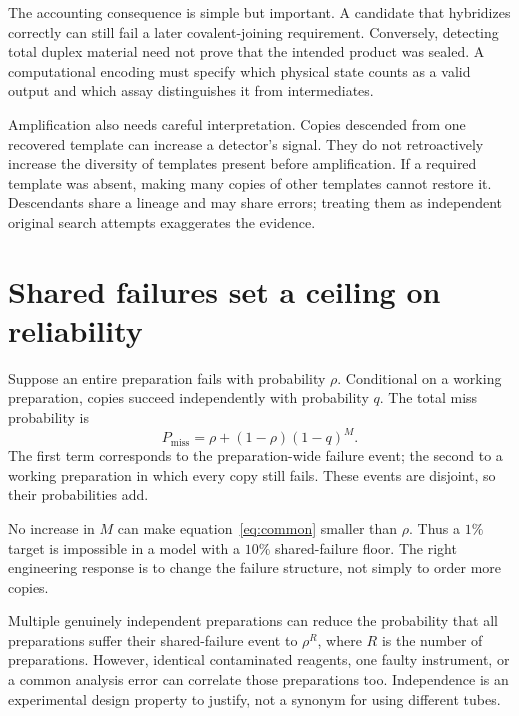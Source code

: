 The accounting consequence is simple but important. A candidate that hybridizes correctly can still fail a later covalent-joining requirement. Conversely, detecting total duplex material need not prove that the intended product was sealed. A computational encoding must specify which physical state counts as a valid output and which assay distinguishes it from intermediates.

Amplification also needs careful interpretation. Copies descended from one recovered template can increase a detector's signal. They do not retroactively increase the diversity of templates present before amplification. If a required template was absent, making many copies of other templates cannot restore it. Descendants share a lineage and may share errors; treating them as independent original search attempts exaggerates the evidence.

\section{Shared failures set a ceiling on reliability}

Suppose an entire preparation fails with probability $\rho$. Conditional on a working preparation, copies succeed independently with probability $q$. The total miss probability is
\begin{equation}
P_{\mathrm{miss}}=\rho+(1-\rho)(1-q)^M. \label{eq:common}
\end{equation}
The first term corresponds to the preparation-wide failure event; the second to a working preparation in which every copy still fails. These events are disjoint, so their probabilities add.


No increase in $M$ can make equation~\ref{eq:common} smaller than $\rho$. Thus a $1\%$ target is impossible in a model with a $10\%$ shared-failure floor. The right engineering response is to change the failure structure, not simply to order more copies.

Multiple genuinely independent preparations can reduce the probability that all preparations suffer their shared-failure event to $\rho^R$, where $R$ is the number of preparations. However, identical contaminated reagents, one faulty instrument, or a common analysis error can correlate those preparations too. Independence is an experimental design property to justify, not a synonym for using different tubes.

